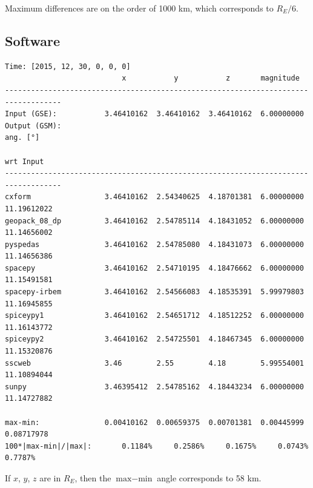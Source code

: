 \documentclass[draft]{agujournal2019}
\begin{document}
Maximum differences are on the order of 1000 km, which corresponds to $R_E/6$.


\subsection{Software}
\label{sect:comparisons_software}

\small
\begin{verbatim}
Time: [2015, 12, 30, 0, 0, 0]
                           x           y           z       magnitude
-----------------------------------------------------------------------------------
Input (GSE):           3.46410162  3.46410162  3.46410162  6.00000000
Output (GSM):                                                         ang. [°]
                                                                      wrt Input
-----------------------------------------------------------------------------------
cxform                 3.46410162  2.54340625  4.18701381  6.00000000 11.19612022
geopack_08_dp          3.46410162  2.54785114  4.18431052  6.00000000 11.14656002
pyspedas               3.46410162  2.54785080  4.18431073  6.00000000 11.14656386
spacepy                3.46410162  2.54710195  4.18476662  6.00000000 11.15491581
spacepy-irbem          3.46410162  2.54566083  4.18535391  5.99979803 11.16945855
spiceypy1              3.46410162  2.54651712  4.18512252  6.00000000 11.16143772
spiceypy2              3.46410162  2.54725501  4.18467345  6.00000000 11.15320876
sscweb                 3.46        2.55        4.18        5.99554001 11.10894044
sunpy                  3.46395412  2.54785162  4.18443234  6.00000000 11.14727882

max-min:               0.00410162  0.00659375  0.00701381  0.00445999  0.08717978
100*|max-min|/|max|:       0.1184%     0.2586%     0.1675%     0.0743%     0.7787%
\end{verbatim}
\normalsize

\noindent
If $x$, $y$, $z$ are in $R_E$, then the $\mbox{max}-\mbox{min}$ angle corresponds to 58 km.

\end{document}
